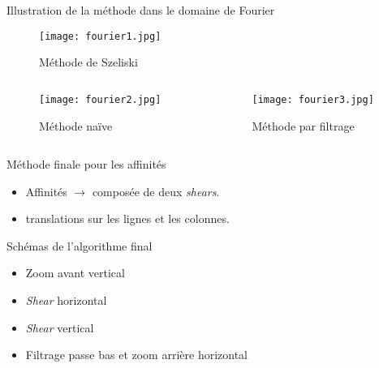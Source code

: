 \documentclass[c,12pt]{beamer}
\newcommand{\ra}[0]{\rightarrow}
\begin{document}
\begin{frame}{Illustration de la méthode dans le domaine de Fourier }

\begin{figure}
\centering
\texttt{[image: fourier1.jpg]}
\caption{Méthode de Szeliski}
\end{figure}

\begin{columns}
\begin{column}{4cm}

\begin{figure}
\centering
\texttt{[image: fourier2.jpg]}
\caption{Méthode naïve}
\end{figure}


\end{column}

\begin{column}{6cm}

\begin{figure}
\centering
\texttt{[image: fourier3.jpg]}
\caption{Méthode par filtrage}
\end{figure}


\end{column}
\end{columns}

\end{frame}

\begin{frame}{Méthode finale pour les affinités}
\begin{itemize}
\item Affinités $\ra$ composée de deux \emph{shears}.
\item translations sur les lignes et les colonnes.
\end{itemize}

\begin{block}{Schémas de l'algorithme final}

\begin{itemize}
\item Zoom avant vertical
\item \emph{Shear} horizontal
\item \emph{Shear} vertical
\item Filtrage passe bas et zoom arrière horizontal
\end{itemize}

\end{block}

\end{frame}
\end{document}
